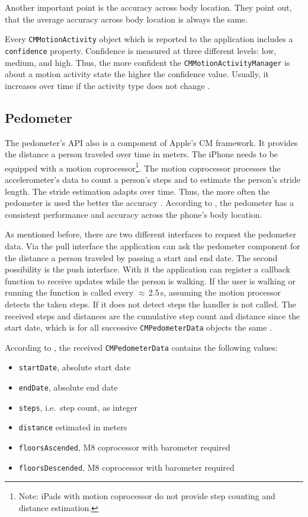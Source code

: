 Another important point is the accuracy across body location. They point out, that the average accuracy across body location is always the same.

Every \texttt{CMMotionActivity} object which is reported to the application includes a \texttt{confidence} property. Confidence is measured at three different levels: low, medium, and high. Thus, the more confident the \texttt{CMMotionActivityManager} is about a motion activity state the higher the confidence value. Usually, it increases over time if the activity type does not change \citep{apple:wwdc_2014_pham,apple:ios_doc_cm}.


\subsection{Pedometer}
The pedometer's \acs{API} also is a component of Apple's \acs{CM} framework. It provides the distance a person traveled over time in meters. The iPhone needs to be equipped with a motion coprocessor\footnote{Note: iPads with motion coprocessor do not provide step counting and distance estimation.}. The motion coprocessor processes the accelerometer's data to count a person's steps and to estimate the person's stride length. The stride estimation adapts over time. Thus, the more often the pedometer is used the better the accuracy \citep{apple:wwdc_2014_pham}. According to \citet{apple:wwdc_2014_pham}, the pedometer has a consistent performance and accuracy across the phone's body location.

As mentioned before, there are two different interfaces to request the pedometer data. Via the pull interface the application can ask the pedometer component for the distance a person traveled by passing a start and end date. The second possibility is the push interface. With it the application can register a callback function to receive updates while the person is walking. If the user is walking or running the function is called every $\approx$\,2.5\,s, assuming the motion processor detects the taken steps. If it does not detect steps the handler is not called. The received steps and distances are the cumulative step count and distance since the start date, which is for all successive \texttt{CMPedometerData} objects the same \citep{apple:wwdc_2014_pham}.

According to \citet{apple:ios_doc_cm}, the received \texttt{CMPedometerData} contains the following values:
\begin{itemize}
  \item \texttt{startDate}, absolute start date
  \item \texttt{endDate}, absolute end date
  \item \texttt{steps}, i.e.\ step count, as integer
  \item \texttt{distance} estimated in meters
  \item \texttt{floorsAscended}, M8 coprocessor with barometer required
  \item \texttt{floorsDescended}, M8 coprocessor with barometer required
\end{itemize}

